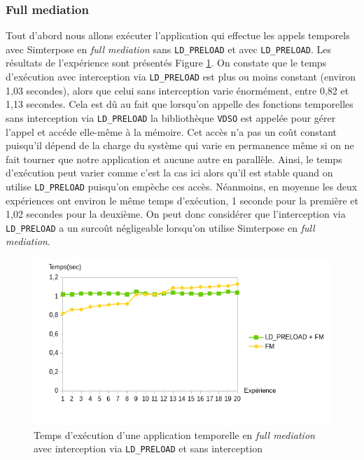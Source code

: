 \subsubsection{Full mediation}
 Tout d'abord nous allons exécuter l'application qui effectue les appels temporels avec Simterpose en \textit{full mediation} sans \texttt{LD\_PRELOAD} et avec \texttt{LD\_PRELOAD}. Les résultats de l'expérience sont présentés Figure \ref{Temps_FM}. On constate que le temps d'exécution avec interception via \texttt{LD\_PRELOAD} est plus ou moins constant (environ 1,03 secondes), alors que celui sans interception varie énormément, entre 0,82 et 1,13 secondes. Cela est dû au fait que lorsqu'on appelle des fonctions temporelles sans interception via \texttt{LD\_PRELOAD} la bibliothèque \texttt{VDSO} est appelée pour gérer l'appel et accéde elle-même à la mémoire. Cet accès n'a pas un coût constant puisqu'il dépend de la charge du système qui varie en permanence même si on ne fait tourner que notre application et aucune autre en parallèle. Ainsi, le temps d'exécution peut varier comme c'est la cas ici alors qu'il est stable quand on utilise \texttt{LD\_PRELOAD} puisqu'on empèche ces accès. Néanmoins, en moyenne les deux expériences ont environ le même temps d'exécution, 1 seconde pour la première et 1,02 secondes pour la deuxième. On peut donc considérer que l'interception via \texttt{LD\_PRELOAD} a un surcoût négligeable lorsqu'on utilise Simterpose en \textit{full mediation}.

\begin{figure}
  \centering
    \includegraphics[scale=0.80]{mesures/graph/Temps_FM.png}
    \caption{Temps d'exécution d'une application temporelle en \textit{full mediation} avec interception via \texttt{LD\_PRELOAD} et sans interception}
    \label{Temps_FM}
\end{figure}

